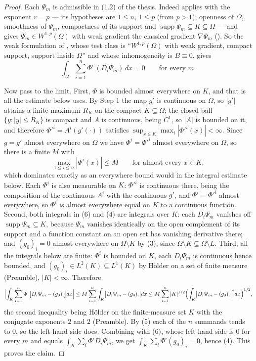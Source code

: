 \begin{proof}
Each $\Psi_m$ is admissible in (1.2) of the thesis.  Indeed
 applies with the exponent $r=p$ --- its
hypotheses are $1\le n$, $1\le p$ (from $p>1$), openness of $\Omega$,
smoothness of $\Psi_m$, compactness of its support and
$\operatorname{supp}\Psi_m\subseteq K\subseteq\Omega$ --- and gives
$\Psi_m\in W^{1,p}(\Omega)$ with weak gradient the classical gradient
$\nabla\Psi_m$ ().  So the weak formulation of
, whose test class is ``$W^{1,p}(\Omega)$ with weak
gradient, compact support, support inside $\Omega$'' and whose inhomogeneity is
$B\equiv0$, gives
\[
\int_\Omega\sum_{i=1}^n\Phi^i\,(D_i\Psi_m)\,dx=0\qquad\text{for every }m .
\tag{6}
\]

Now pass to the limit.  First, $\Phi$ is bounded almost everywhere on $K$, and
that is all the estimate below uses.  By Step 1 the map $g'$ is continuous on
$\Omega$, so $|g'|$ attains a finite maximum $R_K$ on the compact
$K\subseteq\Omega$; the closed ball $\{y:|y|\le R_K\}$ is compact and $A$ is
continuous, being $C^1$, so $|A|$ is bounded on it, and therefore
$\Phi'^i=A^i(g'(\cdot))$ satisfies
$\sup_{x\in K}\max_i|\Phi'^i(x)|<\infty$.  Since $g=g'$ almost everywhere on
$\Omega$ we have $\Phi^i=\Phi'^i$ almost everywhere on $\Omega$, so there is a
finite $M$ with
\[
\max_{1\le i\le n}|\Phi^i(x)|\le M\qquad\text{for almost every }x\in K ,
\]
which dominates exactly as an everywhere bound would in the integral estimate
below.  Each $\Phi^i$ is also measurable on $K$: $\Phi'^i$ is continuous there,
being the composition of the continuous $A^i$ with the continuous $g'$, and
$\Phi^i=\Phi'^i$ almost everywhere, so $\Phi^i$ is almost everywhere equal on
$K$ to a continuous function.  Second, both integrals in (6) and (4) are
integrals over $K$: each $D_i\Psi_m$ vanishes off $\operatorname{supp}\Psi_m
\subseteq K$, because $\Psi_m$ vanishes identically on the open complement of
its support and a function constant on an open set has vanishing derivative
there; and $(g_0)_i=0$ almost everywhere on $\Omega\setminus K$ by (3),
since $\Omega\setminus K\subseteq\Omega\setminus L$.  Third, all the integrals
below are finite: $\Phi^i$ is bounded on $K$, each $D_i\Psi_m$ is continuous
hence bounded, and $(g_0)_i\in L^2(K)\subseteq L^1(K)$ by H\"older on a set of
finite measure (Preamble), $|K|<\infty$.  Therefore
\[
\Bigl|\int_K\sum_{i=1}^n\Phi^i\bigl[D_i\Psi_m-(g_0)_i\bigr]dx\Bigr|
\le M\sum_{i=1}^n\int_K\bigl|D_i\Psi_m-(g_0)_i\bigr|dx
\le M\sum_{i=1}^n|K|^{1/2}\Bigl(\int_K\bigl|D_i\Psi_m-(g_0)_i\bigr|^2dx\Bigr)^{1/2},
\]
the second inequality being H\"older on the finite-measure set $K$ with the
conjugate exponents $2$ and $2$ (Preamble).  By (5) each of the $n$ summands
tends to $0$, so the left-hand side does.  Combining with (6), whose left-hand
side is $0$ for every $m$ and equals $\int_K\sum_i\Phi^iD_i\Psi_m$, we get
$\int_K\sum_i\Phi^i(g_0)_i=0$, hence (4).  This proves the claim.


\end{proof}
